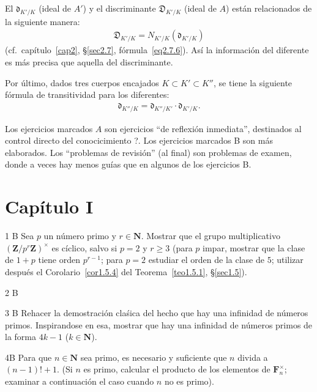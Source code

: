 \documentclass[oneside,bibtotoc,leqno,spanish]{amsbook}
\newcommand{\ZZ}{\mathbf{Z}}
\newcommand{\NN}{\mathbf{N}}
\newcommand{\FF}{\mathbf{F}}
\newcommand{\disc}{\mathfrak{D}}
\newcommand{\diff}{\mathfrak{d}}
\numberwithin{equation}{section}
\theoremstyle{defi}
\newcommand{\exername}{}
\newtheorem*{namedexer}{\exername}
\newenvironment{exer*}[1]{\renewcommand{\exername}{#1}\begin{namedexer}}{\end{namedexer}}
\theoremstyle{note}
\theoremstyle{rem}
\numberwithin{theorem}{section}
\numberwithin{proposition}{section}
\numberwithin{definition}{section}
\numberwithin{lemma}{section}
\numberwithin{corollary}{section}
\numberwithin{example}{section}
\numberwithin{footnote}{section}%
\begin{document}
El  $\diff_{K'/K}$ (ideal de $A'$) y el discriminante $\disc_{K'/K}$ (ideal de $A$) est\'an relacionados
de la siguiente manera:
\begin{gather}
\disc_{K'/K}=N_{K'/K}(\diff_{K'/K})
\end{gather}
(cf.~cap\'itulo~\ref{cap2}, \S\ref{sec2.7}, f\'ormula~\eqref{eq2.7.6}). As\'i la informaci\'on del diferente es m\'as
precisa que aquella del discriminante.

Por \'ultimo, dados tres cuerpos encajados $K\subset K'\subset K''$, se tiene la siguiente f\'ormula de transitividad
para los diferentes:
\begin{gather}
\diff_{K''/K} = \diff_{K''/K'}\cdot\diff_{K'/K}.
\end{gather}


Los ejercicios marcados $A$ son ejercicios ``de reflexi\'on inmediata'', destinados al
control directo del conocicimiento ?. Los ejercicios marcados B son m\'as elaborados. Los
``problemas de revisi\'on'' (al final) son problemas de examen, donde a veces hay menos gu\'ias
que en algunos de los ejercicios B.

\section*{Cap\'itulo I}

\begin{exer*}{1 B}
Sea $p$ un n\'umero primo y $r\in\NN$. Mostrar que el grupo multiplicativo
$(\ZZ/p^r\ZZ)^\times$ es c\'iclico, salvo si $p=2$ y $r\geq 3$ (para $p$ impar,
mostrar que la clase de $1+p$ tiene orden $p^{r-1}$; para $p=2$ estudiar el orden
de la clase de $5$; utilizar despu\'es el Corolario~\ref{cor1.5.4} del Teorema~\ref{teo1.5.1},
\S\ref{sec1.5}).
\end{exer*}

\begin{exer*}{2 B}
\end{exer*}

\begin{exer*}{3 B}
Rehacer la demostraci\'on cla\'sica del hecho que hay una infinidad de n\'umeros primos. Inspirandose
en esa, mostrar que hay una infinidad de n\'umeros primos de la forma $4k-1$ ($k\in\NN$).
\end{exer*}

\begin{exer*}{4B}
Para que $n\in\NN$ sea primo, es necesario y suficiente que $n$ divida a
$(n-1)!+1$. (Si $n$ es primo, calcular el producto de los elementos de $\FF_n^\times$;
examinar a continuaci\'on el caso cuando $n$ no es primo).
\end{exer*}
\end{document}
